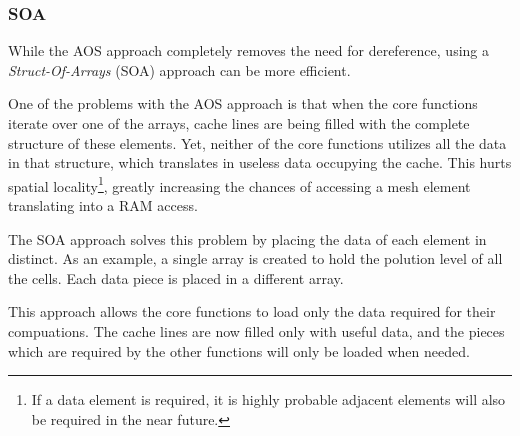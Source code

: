 \subsubsection{SOA}

While the AOS approach completely removes the need for dereference, using a \textit{Struct-Of-Arrays} (SOA) approach can be more efficient.

One of the problems with the AOS approach is that when the core functions iterate over one of the arrays, cache lines are being filled with the complete structure of these elements. Yet, neither of the core functions utilizes all the data in that structure, which translates in useless data occupying the cache. This hurts spatial locality\footnote{If a data element is required, it is highly probable adjacent elements will also be required in the near future.}, greatly increasing the chances of accessing a mesh element translating into a RAM access.

The SOA approach solves this problem by placing the data of each element in distinct. As an example, a single array is created to hold the polution level of all the cells. Each data piece is placed in a different array.

This approach allows the core functions to load only the data required for their compuations. The cache lines are now filled only with useful data, and the pieces which are required by the other functions will only be loaded when needed.